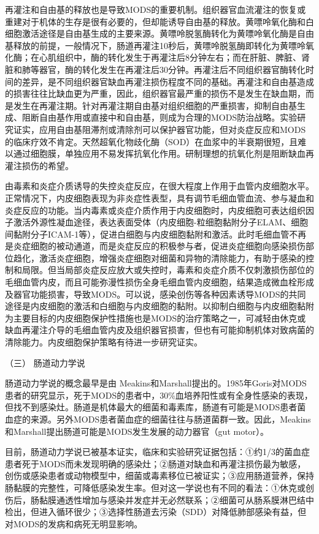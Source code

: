 再灌注和自由基的释放也是导致MODS的重要机制。组织器官血流灌注的恢复或重建对于机体的生存是很有必要的，但却能诱导自由基的释放。黄嘌呤氧化酶和白细胞激活途径是自由基生成的主要来源。黄嘌呤脱氢酶转化为黄嘌呤氧化酶是自由基释放的前提，一般情况下，肠道再灌注10秒后，黄嘌呤脱氢酶即转化为黄嘌呤氧化酶；在心肌组织中，酶的转化发生于再灌注后8分钟左右；而在肝脏、脾脏、肾脏和肺等器官，酶的转化发生在再灌注后30分钟。再灌注后不同组织器官酶转化时间的差异，是不同组织器官缺血再灌注损伤程度不同的基础。再灌注和自由基造成的损害往往比缺血更为严重，因此，组织器官最严重的损伤不是发生在缺血期，而是发生在再灌注期。针对再灌注期自由基对组织细胞的严重损害，抑制自由基生成、阻断自由基作用或直接中和自由基，则成为合理的MODS防治战略。实验研究证实，应用自由基阻滞剂或清除剂可以保护器官功能，但对炎症反应和MODS的临床疗效不肯定。天然超氧化物歧化酶（SOD）在血浆中的半衰期很短，且难以通过细胞膜，单独应用不易发挥抗氧化作用。研制理想的抗氧化剂是阻断缺血再灌注损伤的希望。

由毒素和炎症介质诱导的失控炎症反应，在很大程度上作用于血管内皮细胞水平。正常情况下，内皮细胞表现为非炎症性表型，具有调节毛细血管血流、参与凝血和炎症反应的功能。当内毒素或炎症介质作用于内皮细胞时，内皮细胞可表达组织因子激活外源性凝血途径，表达表面受体（内皮细胞-粒细胞黏附分子ELAM、细胞间黏附分子ICAM-1等），促进白细胞与内皮细胞黏附和激活。此时毛细血管不再是炎症细胞的被动通道，而是炎症反应的积极参与者，促进炎症细胞向感染损伤部位趋化，激活炎症细胞，增强炎症细胞对细菌和异物的清除能力，有助于感染的控制和局限。但当局部炎症反应放大或失控时，毒素和炎症介质不仅刺激损伤部位的毛细血管内皮，而且可能弥漫性损伤全身毛细血管内皮细胞，结果造成微血栓形成及器官功能损害，导致MODS。可以说，感染创伤等各种因素诱导MODS的共同途径是内皮细胞的激活和白细胞与内皮细胞的黏附。以抑制白细胞与内皮细胞黏附为主要目标的内皮细胞保护性措施也是MODS的治疗策略之一，可减轻由休克或缺血再灌注介导的毛细血管内皮及组织器官损害，但也有可能抑制机体对致病菌的清除能力。内皮细胞保护策略有待进一步研究证实。

\hypertarget{text00093.htmlux5cux23CHP3-11-2-2-3}{}
（三） 肠道动力学说

肠道动力学说的概念最早是由
Meakins和Marshall提出的。1985年Goris对MODS患者的研究显示，死于MODS的患者中，30\%血培养阳性或有全身性感染的表现，但找不到感染灶。肠道是机体最大的细菌和毒素库，肠道有可能是MODS患者菌血症的来源。另外MODS患者菌血症的细菌往往与肠道菌群一致。因此，Meakins和Marshall提出肠道可能是MODS发生发展的动力器官（gut
motor）。

目前，肠道动力学说已被基本证实，临床和实验研究证据包括：①约1/3的菌血症患者死于MODS而未发现明确的感染灶；②肠道对缺血和再灌注损伤最为敏感，创伤或感染患者或动物模型中，细菌或毒素移位已被证实；③应用肠道营养，保持肠黏膜的完整性，可降低感染发生率。但对这一学说也有不同的看法：①休克或创伤后，肠黏膜通透性增加与感染并发症并无必然联系；②细菌可从肠系膜淋巴结中检出，但进入循环很少；③选择性肠道去污染（SDD）对降低肺部感染有益，但对MODS的发病和病死无明显影响。

